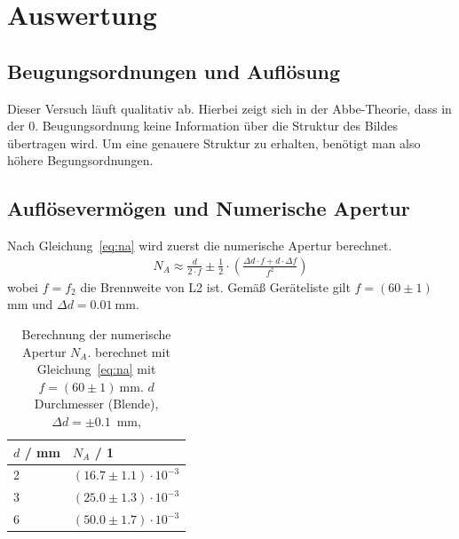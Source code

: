 \documentclass{article}
\begin{document}
\newpage



\section{Auswertung}

\subsection{Beugungsordnungen und Auflösung}

Dieser Versuch läuft qualitativ ab. Hierbei zeigt sich in der Abbe-Theorie, dass in der 0. Beugungsordnung keine Information über die Struktur des Bildes übertragen wird. Um eine genauere Struktur zu erhalten, benötigt man also höhere Begungsordnungen.




\subsection{Auflösevermögen und Numerische Apertur}


Nach Gleichung~\eqref{eq:na} wird zuerst die numerische Apertur berechnet.
\begin{align*}
N_A \approx \frac{d}{2\cdot f} \pm \frac{1}{2}\cdot \left( \frac{\Delta d\cdot f +  d\cdot \Delta f}{f^2}\right)
\end{align*}
wobei $f=f_2$ die Brennweite von L2 ist. Gemäß Geräteliste gilt $f = (60\pm1)~$mm und $\Delta d =  0.01~$mm.


\begin{table}[H]
\caption{Berechnung der numerische Apertur $N_A$. berechnet mit Gleichung~\eqref{eq:na} mit $f=(60\pm1)~$mm. $d$ Durchmesser (Blende), $\Delta d = \pm 0.1$~mm,}
\label{tab:na}
\begin{tabular}{ll}
$d$ / mm  & $N_A$ / 1 \\
\hline
2 & $(16.7 \pm 1.1)\cdot 10^{-3}$ \\
3 & $(25.0 \pm 1.3)\cdot 10^{-3}$ \\
6 & $(50.0 \pm 1.7)\cdot 10^{-3}$
\end{tabular}
\end{table}
\end{document}
